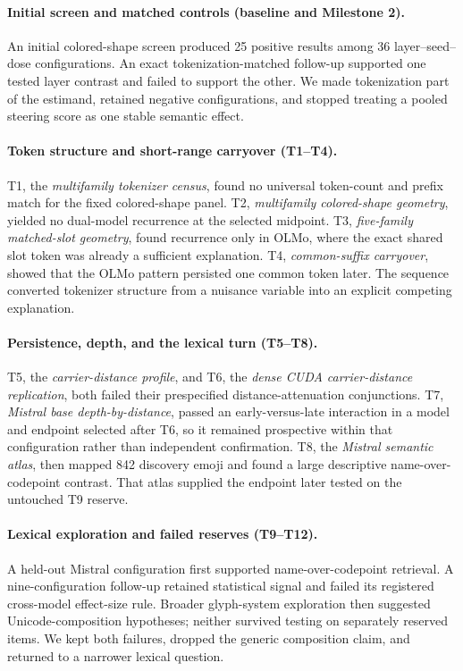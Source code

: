 \documentclass{article}
\begin{document}
\paragraph{Initial screen and matched controls (baseline and Milestone 2).}
An initial colored-shape screen produced 25 positive results among 36
layer--seed--dose configurations. An exact tokenization-matched follow-up
supported one tested layer contrast and failed to support the other. We made
tokenization part of the estimand, retained negative configurations, and
stopped treating a pooled steering score as one stable semantic effect.

\paragraph{Token structure and short-range carryover (T1--T4).}
T1, the \emph{multifamily tokenizer census}, found no universal token-count
and prefix match for the fixed colored-shape panel. T2, \emph{multifamily
colored-shape geometry}, yielded no dual-model recurrence at the selected
midpoint. T3, \emph{five-family matched-slot geometry}, found recurrence only
in OLMo, where the exact shared slot token was already a sufficient
explanation. T4, \emph{common-suffix carryover}, showed that the OLMo pattern
persisted one common token later. The sequence converted tokenizer structure
from a nuisance variable into an explicit competing explanation.

\paragraph{Persistence, depth, and the lexical turn (T5--T8).}
T5, the \emph{carrier-distance profile}, and T6, the \emph{dense CUDA
carrier-distance replication}, both failed their prespecified
distance-attenuation conjunctions. T7, \emph{Mistral base
depth-by-distance}, passed an early-versus-late interaction in a model and
endpoint selected after T6, so it remained prospective within that configuration
rather than independent confirmation. T8, the \emph{Mistral semantic atlas},
then mapped 842 discovery emoji and found a large descriptive
name-over-codepoint contrast. That atlas supplied the endpoint later tested on
the untouched T9 reserve.

\paragraph{Lexical exploration and failed reserves (T9--T12).}
A held-out Mistral configuration first supported name-over-codepoint retrieval. A
nine-configuration follow-up retained statistical signal and failed its
registered cross-model effect-size rule. Broader glyph-system exploration then suggested
Unicode-composition hypotheses; neither survived testing on separately
reserved items. We kept both failures, dropped the generic composition claim,
and returned to a narrower lexical question.
\end{document}
